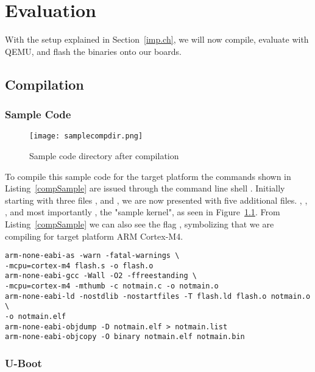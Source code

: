 \chapter{Evaluation}

With the setup explained in Section~\ref{imp.ch}, we will now compile, evaluate with QEMU, and flash the binaries onto our boards.

\section{Compilation} \label{comp.ch}
\subsection{Sample Code}

\begin{figure}[H]
\centering
\texttt{[image: samplecompdir.png]}
\caption{Sample code directory after compilation}
\label{fig:samplecomp}
\end{figure}

To compile this sample code for the target platform the commands shown in Listing~\ref{compSample} are issued through the command line shell . Initially starting with three files ,  and , we are now presented with five additional files. , , ,  and most importantly , the "sample kernel", as seen in Figure~\ref{fig:samplecomp}. From Listing~\ref{compSample} we can also see the flag , symbolizing that we are compiling for target platform ARM Cortex-M4.

\begin{lstlisting}[style=SH, caption=Compiling sample code with gcc-arm-none-eabi toolchain, label=compSample, float, floatplacement=H]
arm-none-eabi-as -warn -fatal-warnings \
-mcpu=cortex-m4 flash.s -o flash.o
arm-none-eabi-gcc -Wall -O2 -ffreestanding \
-mcpu=cortex-m4 -mthumb -c notmain.c -o notmain.o
arm-none-eabi-ld -nostdlib -nostartfiles -T flash.ld flash.o notmain.o \
-o notmain.elf
arm-none-eabi-objdump -D notmain.elf > notmain.list
arm-none-eabi-objcopy -O binary notmain.elf notmain.bin
\end{lstlisting}

\subsection{U-Boot}

